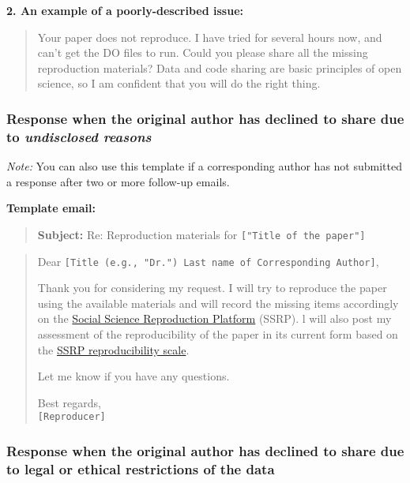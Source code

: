 \textbf{2. An example of a poorly-described issue:}

\begin{quote}
Your paper does not reproduce. I have tried for several hours now, and
can't get the DO files to run. Could you please share all the missing
reproduction materials? Data and code sharing are basic principles of
open science, so I am confident that you will do the right thing.
\end{quote}

\subsubsection{\texorpdfstring{Response when the original author has
declined to share due to \textit{undisclosed
reasons}}{Response when the original author has declined to share due to undisclosed reasons}}

\textit{Note:} You can also use this template if a corresponding author
has not submitted a response after two or more follow-up emails.

\textbf{Template email:}

\begin{quote}
\textbf{Subject:} Re: Reproduction materials for
\texttt{{[}"Title\ of\ the\ paper"{]}}
\end{quote}

\begin{quote}
Dear
\texttt{{[}Title\ (e.g.,\ "Dr.")\ Last\ name\ of\ Corresponding\ Author{]}},

Thank you for considering my request. I will try to reproduce the paper
using the available materials and will record the missing items
accordingly on the
\href{https://www.socialsciencereproduction.org/}{Social Science
Reproduction Platform} (SSRP). l will also post my assessment of the
reproducibility of the paper in its current form based on the
\href{https://bitss.github.io/ACRE/assessment.html\#levels-of-computational-reproducibility-for-a-specific-output}{SSRP
reproducibility scale}.

Let me know if you have any questions.

Best regards,\\
\texttt{{[}Reproducer{]}}
\end{quote}

\subsubsection{Response when the original author has declined to share
due to legal or ethical restrictions of the
data}

